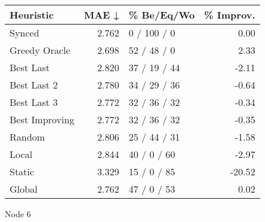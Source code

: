 \begin{tabular}{lrlr}
\toprule
\textbf{Heuristic} & \textbf{MAE ↓} & \textbf{\% Be/Eq/Wo} & \textbf{\% Improv.} \\
\midrule
            Synced &          2.762 &          0 / 100 / 0 &                0.00 \\
     Greedy Oracle &          2.698 &          52 / 48 / 0 &                2.33 \\
         Best Last &          2.820 &         37 / 19 / 44 &               -2.11 \\
       Best Last 2 &          2.780 &         34 / 29 / 36 &               -0.64 \\
       Best Last 3 &          2.772 &         32 / 36 / 32 &               -0.34 \\
    Best Improving &          2.772 &         32 / 36 / 32 &               -0.35 \\
            Random &          2.806 &         25 / 44 / 31 &               -1.58 \\
             Local &          2.844 &          40 / 0 / 60 &               -2.97 \\
            Static &          3.329 &          15 / 0 / 85 &              -20.52 \\
            Global &          2.762 &          47 / 0 / 53 &                0.02 \\
\bottomrule
\end{tabular}
\caption{Node 6}
\label{tab:hr_iid_lr05_le2_bs4_6}
